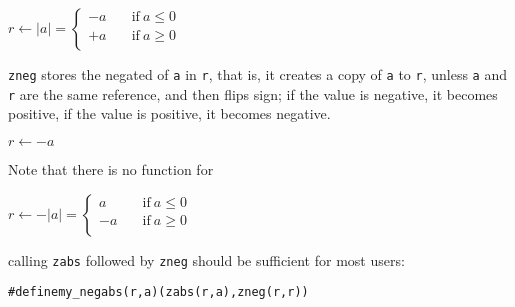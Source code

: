 \vspace{1em}
\(
    r \gets \lvert a \rvert =
    \left \lbrace \begin{array}{rl}
        -a & \quad \textrm{if}~a \le 0 \\
        +a & \quad \textrm{if}~a \ge 0 \\
    \end{array} \right .
\)
\vspace{1em}

{\tt zneg} stores the negated of {\tt a}
in {\tt r}, that is, it creates a copy of
{\tt a} to {\tt r}, unless {\tt a} and {\tt r}
are the same reference, and then flips sign;
if the value is negative, it becomes positive,
if the value is positive, it becomes negative.

\vspace{1em}
\(
    r \gets -a
\)
\vspace{1em}

Note that there is no function for

\vspace{1em}
\(
    r \gets -\lvert a \rvert =
    \left \lbrace \begin{array}{rl}
         a & \quad \textrm{if}~a \le 0 \\
        -a & \quad \textrm{if}~a \ge 0 \\
    \end{array} \right .
\)
\vspace{1em}

\noindent
calling {\tt zabs} followed by {\tt zneg}
should be sufficient for most users:

\begin{alltt}
   #define my_negabs(r, a)  (zabs(r, a), zneg(r, r))
\end{alltt}
